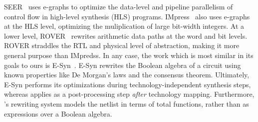 SEER~\cite{seer} uses e-graphs to optimize the data-level and pipeline
parallelism of control flow in high-level synthesis (HLS) programs.
IMpress~\cite{impress} also uses e-graphs at the HLS level, optimizing the
muliplication of large bit-width integers. At a lower level,
ROVER~\cite{rover,roverbl,egraphconstraints} rewrites arithmetic data paths at
the word and bit levels. ROVER straddles the RTL and physical level of
abstraction, making it more general purpose than IMpredss. In any case, the
work which is most similar in its goals to ours is E-Syn~\cite{esynth}. E-Syn
rewrites the Boolean algebra of a circuit using known properties like De
Morgan's laws and the consensus theorem. Ultimately, E-Syn performs its
optimizations during technology-independent synthesis steps, whereas
\shortname{} applies as a post-processing step \textit{after} technology
mapping. Furthermore, \shortname{}'s rewriting system models the netlist in
terms of total functions, rather than as expressions over a Boolean algebra.
